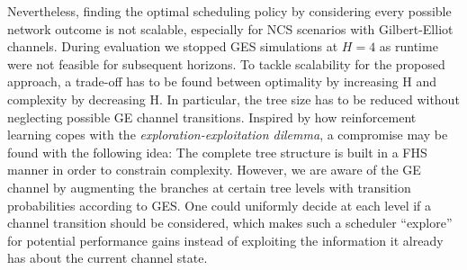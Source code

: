 Nevertheless, finding the optimal scheduling policy by considering every
possible network outcome is not scalable, especially for NCS scenarios with
Gilbert-Elliot channels. During evaluation we stopped GES simulations at $H=4$
as runtime were not feasible for subsequent horizons. To tackle scalability for
the proposed approach, a trade-off has to be found between optimality by
increasing H and complexity by decreasing H. In particular, the tree size has to
be reduced without neglecting possible GE channel transitions. Inspired by how
reinforcement learning copes with the \textit{exploration-exploitation dilemma},
a compromise may be found with the following idea: The complete tree structure
is built in a FHS manner in order to constrain complexity. However, we are aware
of the GE channel by augmenting the branches at certain tree levels with
transition probabilities according to GES. One could uniformly decide at each
level if a channel transition should be considered, which makes such a scheduler
``explore'' for potential performance gains instead of exploiting the
information it already has about the current channel state.
